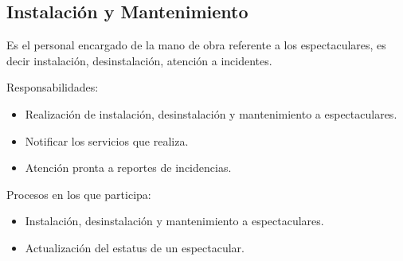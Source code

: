 
\begin{Usuario}{\subsection{Instalación y Mantenimiento}}{
    Es el personal encargado de la mano de obra referente a los espectaculares, es decir instalación, desinstalación, atención a incidentes.\\
}
    \item[Responsabilidades:] \cdtEmpty
    \begin{itemize}
        \item Realización de instalación, desinstalación y mantenimiento a espectaculares.
		\item Notificar los servicios que realiza.
		\item Atención pronta a reportes de incidencias.
    \end{itemize}

	\item[Procesos en los que participa:] \cdtEmpty
    \begin{itemize}
		\item Instalación, desinstalación y mantenimiento a espectaculares.
		\item Actualización del estatus de un espectacular.
    \end{itemize}
\end{Usuario}


